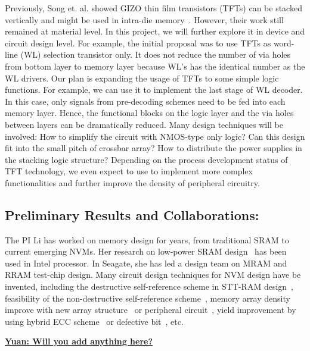 Previously, Song et. al. showed GIZO thin film transistors (TFTs) can be stacked vertically and might be used in intra-die memory~\cite{Song08}. However, their work still remained at material level. In this project, we will further explore it in device and circuit design level. For example, the initial proposal was to use TFTs as word-line (WL) selection transistor only. It does not reduce the number of via holes from bottom layer to memory layer because WL's has the identical number as the WL drivers. Our plan is expanding the usage of TFTs to some simple logic functions. For example, we can use it to implement the last stage of WL decoder. In this case, only signals from pre-decoding schemes need to be fed into each memory layer. Hence, the functional blocks on the logic layer and the via holes between layers can be dramatically reduced. Many design techniques will be involved: How to simplify the circuit with NMOS-type only logic? Can this design fit into the small pitch of crossbar array? How to distribute the power supplies in the stacking logic structure? Depending on the process development status of TFT technology, we even expect to use to implement more complex functionalities and further improve the density of peripheral circuitry.

\subsection{Preliminary Results and Collaborations:}
The PI Li has worked on memory design for years, from traditional SRAM to current emerging NVMs. Her research on low-power SRAM design ~\cite{Agarwal02,Agarwal03,Bhunia02}has been used in Intel processor. In Seagate, she has led a design team on MRAM and RRAM test-chip design. Many circuit design techniques for NVM design have be invented, including the destructive self-reference scheme in STT-RAM design~\cite{Li:147723}, feasibility of the non-destructive self-reference scheme~\cite{Chen:147727}, memory array density improve with new array structure~\cite{Li:242331,Chen:170549} or peripheral circuit~\cite{Li:250027,Li:426098}, yield improvement by using hybrid ECC scheme~\cite{Chen:198516} or defective bit~\cite{Li:502194}, etc.

\underline{\textbf{Yuan: Will you add anything here?}}

